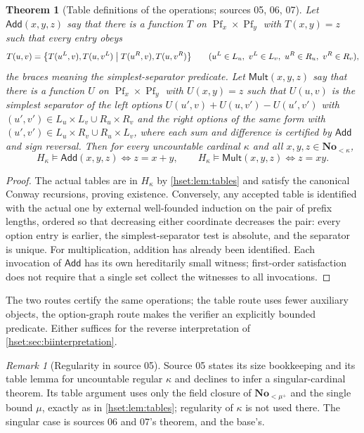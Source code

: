 \documentclass[11pt,letterpaper]{article}
\newtheorem{theorem}{Theorem}[section]
\theoremstyle{definition}
\theoremstyle{remark}
\newtheorem{remark}[remark]{Remark}\aliascntresetthe{remark}
\newcommand{\No}{\mathbf{No}}
\begin{document}
\begin{theorem}[Table definitions of the operations; sources 05, 06, 07]
\label{hset:thm:tables}
Let $\mathsf{Add}(x,y,z)$ say that there is a function $T$ on $\operatorname{Pf}_x\times\operatorname{Pf}_y$
with $T(x,y)=z$ such that every entry obeys
\[
 T(u,v)=\bigl\{T(u^L,v),T(u,v^L)\bigm| T(u^R,v),T(u,v^R)\bigr\}
 \qquad(u^L\in L_u,\ v^L\in L_v,\ u^R\in R_u,\ v^R\in R_v),
\]
the braces meaning the simplest-separator predicate. Let $\mathsf{Mult}(x,y,z)$
say that there is a function $U$ on $\operatorname{Pf}_x\times\operatorname{Pf}_y$ with $U(x,y)=z$ such that
$U(u,v)$ is the simplest separator of the left options
$U(u',v)+U(u,v')-U(u',v')$ with $(u',v')\in L_u\times L_v\cup R_u\times R_v$ and
the right options of the same form with $(u',v')\in L_u\times R_v\cup
R_u\times L_v$, where each sum and difference is certified by $\mathsf{Add}$
and sign reversal. Then for every uncountable cardinal $\kappa$ and all
$x,y,z\in\No_{<\kappa}$,
\[
 H_\kappa\models\mathsf{Add}(x,y,z)\iff z=x+y,
 \qquad
 H_\kappa\models\mathsf{Mult}(x,y,z)\iff z=xy.
\]
\end{theorem}
\begin{proof}
The actual tables are in $H_\kappa$ by \cref{hset:lem:tables} and satisfy the
canonical Conway recursions, proving existence. Conversely, any accepted table
is identified with the actual one by external well-founded induction on the
pair of prefix lengths, ordered so that decreasing either coordinate
decreases the pair: every option entry is earlier, the simplest-separator test
is absolute, and the separator is unique. For multiplication, addition has
already been identified. Each invocation of $\mathsf{Add}$ has its own
hereditarily small witness; first-order satisfaction does not require that a
single set collect the witnesses to all invocations.
\end{proof}

The two routes certify the same operations; the table route uses fewer
auxiliary objects, the option-graph route makes the verifier an explicitly
bounded predicate. Either suffices for the reverse interpretation of
\cref{hset:sec:biinterpretation}.

\begin{remark}[Regularity in source 05]\label{hset:rem:05-regular}
Source 05 states its size bookkeeping and its table lemma for uncountable
regular $\kappa$ and declines to infer a singular-cardinal theorem. Its table
argument uses only the field closure of $\No_{<\mu^+}$ and the single bound
$\mu$, exactly as in \cref{hset:lem:tables}; regularity of $\kappa$ is not used
there. The singular case is sources 06 and 07's theorem, and the base's.
\end{remark}
\end{document}
